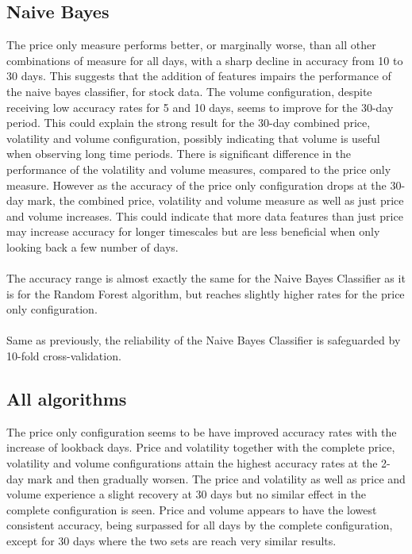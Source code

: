 \documentclass{article}
\begin{document}
\subsection{Naive Bayes}
The price only measure performs better, or marginally worse, than all other combinations of measure for all days, with a sharp decline in accuracy from 10 to 30 days. This suggests that the addition of features impairs the performance of the naive bayes classifier, for stock data. The volume configuration, despite receiving low accuracy rates for 5 and 10 days, seems to improve for the 30-day period. This could explain the strong result for the 30-day combined price, volatility and volume configuration, possibly indicating that volume is useful when observing long time periods. There is significant difference in the performance of the volatility and volume measures, compared to the price only measure. However as the accuracy of the price only configuration drops at the 30-day mark, the combined price, volatility and volume measure as well as just price and volume increases. This could indicate that more data features than just price may increase accuracy for longer timescales but are less beneficial when only looking back a few number of days. 
\\ \\
The accuracy range is almost exactly the same for the Naive Bayes Classifier as it is for the Random Forest algorithm, but reaches slightly higher rates for the price only configuration.
\\ \\
Same as previously, the reliability of the Naive Bayes Classifier is safeguarded by 10-fold cross-validation. 

\subsection{All algorithms}
The price only configuration seems to be have improved accuracy rates with the increase of lookback days. Price and volatility together with the complete price, volatility and volume configurations attain the highest accuracy rates at the 2-day mark and then gradually worsen. The price and volatility as well as price and volume experience a slight recovery at 30 days but no similar effect in the complete configuration is seen. Price and volume appears to have the lowest consistent accuracy, being surpassed for all days by the complete configuration, except for 30 days where the two sets are reach very similar results.
\end{document}
